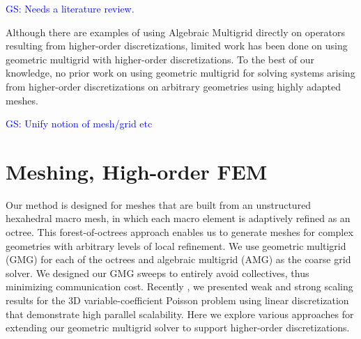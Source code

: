 \documentclass[times]{nlaauth}
\newcommand{\gsnote}[1]{\textcolor{blue}{GS: #1}}
\begin{document}
\gsnote{Needs a literature review.}



Although there are examples of using Algebraic Multigrid directly on
operators resulting from higher-order discretizations, limited work
has been done on using geometric multigrid with higher-order
discretizations. To the best of our knowledge, no prior work on using
geometric multigrid for solving systems arising from higher-order
discretizations on arbitrary geometries using highly adapted meshes.






\gsnote{Unify notion of mesh/grid etc}



\section{Meshing, High-order FEM}

 Our method is designed for meshes that are built from an unstructured
hexahedral macro mesh, in which each macro element is adaptively
refined as an octree. This forest-of-octrees approach enables us to
generate meshes for complex geometries with arbitrary levels of local
refinement. We use geometric multigrid (GMG) for each of the octrees
and algebraic multigrid (AMG) as the coarse grid solver. We designed
our GMG sweeps to entirely avoid collectives, thus minimizing
communication cost. Recently \cite{SundarBirosBursteddeEtAl12}, we
presented weak and strong scaling results for the 3D
variable-coefficient Poisson problem using linear discretization that
demonstrate high parallel scalability. Here we explore various
approaches for extending our geometric multigrid solver to support
higher-order discretizations.
\end{document}
